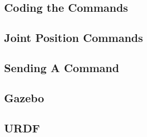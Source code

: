 \documentclass[12pt, letterpaper]{article}
\begin{document}
\subsection{Coding the Commands}

\subsection{Joint Position Commands}

\subsection{Sending A Command}

\subsection{Gazebo}

\subsection{URDF}
\end{document}
